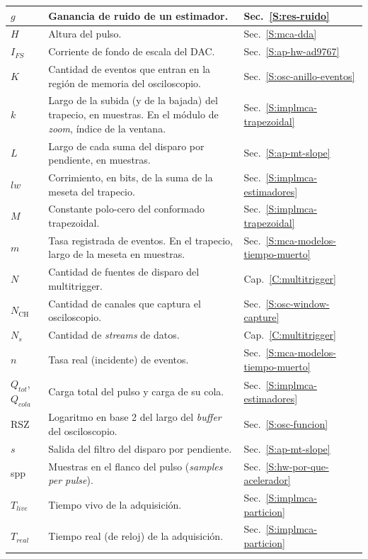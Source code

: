 {\begin{longtable}{|>{\centering\arraybackslash}p{}%
  |>{\raggedright\arraybackslash}p{}%
  |>{\raggedright\arraybackslash}p{}|}
$g$ & Ganancia de ruido de un estimador. & Sec.~\ref{S:res-ruido} \\ \hline
$H$ & Altura del pulso. & Sec.~\ref{S:mca-dda} \\ \hline
$I_{FS}$ & Corriente de fondo de escala del DAC. & Sec.~\ref{S:ap-hw-ad9767} \\ \hline
$K$ & Cantidad de eventos que entran en la región de memoria del osciloscopio. & Sec.~\ref{S:osc-anillo-eventos} \\ \hline
$k$ & Largo de la subida (y de la bajada) del trapecio, en muestras. En el módulo de \emph{zoom}, índice de la ventana. & Sec.~\ref{S:implmca-trapezoidal} \\ \hline
$L$ & Largo de cada suma del disparo por pendiente, en muestras. & Sec.~\ref{S:ap-mt-slope} \\ \hline
$lw$ & Corrimiento, en bits, de la suma de la meseta del trapecio. & Sec.~\ref{S:implmca-estimadores} \\ \hline
$M$ & Constante polo-cero del conformado trapezoidal. & Sec.~\ref{S:implmca-trapezoidal} \\ \hline
$m$ & Tasa registrada de eventos. En el trapecio, largo de la meseta en muestras. & Sec.~\ref{S:mca-modelos-tiempo-muerto} \\ \hline
$N$ & Cantidad de fuentes de disparo del multitrigger. & Cap.~\ref{C:multitrigger} \\ \hline
$N_\text{CH}$ & Cantidad de canales que captura el osciloscopio. & Sec.~\ref{S:osc-window-capture} \\ \hline
$N_s$ & Cantidad de \emph{streams} de datos. & Cap.~\ref{C:multitrigger} \\ \hline
$n$ & Tasa real (incidente) de eventos. & Sec.~\ref{S:mca-modelos-tiempo-muerto} \\ \hline
$Q_{tot}$, $Q_{cola}$ & Carga total del pulso y carga de su cola. & Sec.~\ref{S:implmca-estimadores} \\ \hline
RSZ & Logaritmo en base 2 del largo del \emph{buffer} del osciloscopio. & Sec.~\ref{S:osc-funcion} \\ \hline
$s$ & Salida del filtro del disparo por pendiente. & Sec.~\ref{S:ap-mt-slope} \\ \hline
spp & Muestras en el flanco del pulso (\emph{samples per pulse}). & Sec.~\ref{S:hw-por-que-acelerador} \\ \hline
$T_{live}$ & Tiempo vivo de la adquisición. & Sec.~\ref{S:implmca-particion} \\ \hline
$T_{real}$ & Tiempo real (de reloj) de la adquisición. & Sec.~\ref{S:implmca-particion} \\ \hline

\end{longtable}}
